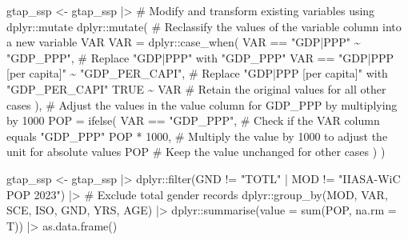 \documentclass[
  letterpaper,
  DIV=11,
  numbers=noendperiod]{scrartcl}
\newenvironment{Shaded}{}{}
\newcommand{\AttributeTok}[1]{\textcolor[rgb]{0.00,0.34,0.68}{#1}}
\newcommand{\CommentTok}[1]{\textcolor[rgb]{0.54,0.53,0.53}{#1}}
\newcommand{\ConstantTok}[1]{\textcolor[rgb]{0.67,0.33,0.00}{#1}}
\newcommand{\DecValTok}[1]{\textcolor[rgb]{0.69,0.50,0.00}{#1}}
\newcommand{\FunctionTok}[1]{\textcolor[rgb]{0.39,0.29,0.61}{#1}}
\newcommand{\NormalTok}[1]{\textcolor[rgb]{0.12,0.11,0.11}{#1}}
\newcommand{\OtherTok}[1]{\textcolor[rgb]{0.00,0.43,0.16}{#1}}
\newcommand{\SpecialCharTok}[1]{\textcolor[rgb]{0.24,0.68,0.91}{#1}}
\newcommand{\StringTok}[1]{\textcolor[rgb]{0.75,0.01,0.01}{#1}}
\begin{document}
\begin{Shaded}
\begin{Highlighting}[]
\NormalTok{gtap\_ssp }\OtherTok{\textless{}{-}}\NormalTok{ gtap\_ssp }\SpecialCharTok{|\textgreater{}}
  \CommentTok{\# Modify and transform existing variables using dplyr::mutate}
\NormalTok{  dplyr}\SpecialCharTok{::}\FunctionTok{mutate}\NormalTok{(}
    \CommentTok{\# Reclassify the values of the \textquotesingle{}variable\textquotesingle{} column into a new variable \textquotesingle{}VAR\textquotesingle{}}
    \AttributeTok{VAR =}\NormalTok{ dplyr}\SpecialCharTok{::}\FunctionTok{case\_when}\NormalTok{(}
\NormalTok{      VAR }\SpecialCharTok{==} \StringTok{"GDP|PPP"} \SpecialCharTok{\textasciitilde{}} \StringTok{"GDP\_PPP"}\NormalTok{,                }\CommentTok{\# Replace "GDP|PPP" with "GDP\_PPP"}
\NormalTok{      VAR }\SpecialCharTok{==} \StringTok{"GDP|PPP [per capita]"} \SpecialCharTok{\textasciitilde{}} \StringTok{"GDP\_PER\_CAPI"}\NormalTok{,  }\CommentTok{\# Replace "GDP|PPP [per capita]" with "GDP\_PER\_CAPI"}
      \ConstantTok{TRUE} \SpecialCharTok{\textasciitilde{}}\NormalTok{ VAR                                    }\CommentTok{\# Retain the original values for all other cases}
\NormalTok{    ),}
    \CommentTok{\# Adjust the values in the \textquotesingle{}value\textquotesingle{} column for GDP\_PPP by multiplying by 1000}
    \AttributeTok{POP =} \FunctionTok{ifelse}\NormalTok{(}
\NormalTok{      VAR }\SpecialCharTok{==} \StringTok{"GDP\_PPP"}\NormalTok{,    }\CommentTok{\# Check if the \textquotesingle{}VAR\textquotesingle{} column equals "GDP\_PPP"}
\NormalTok{      POP }\SpecialCharTok{*} \DecValTok{1000}\NormalTok{,        }\CommentTok{\# Multiply the value by 1000 to adjust the unit for absolute values}
\NormalTok{      POP                }\CommentTok{\# Keep the value unchanged for other cases}
\NormalTok{    )}
\NormalTok{  )}

\NormalTok{gtap\_ssp }\OtherTok{\textless{}{-}}\NormalTok{ gtap\_ssp  }\SpecialCharTok{|\textgreater{}}    
\NormalTok{  dplyr}\SpecialCharTok{::}\FunctionTok{filter}\NormalTok{(GND }\SpecialCharTok{!=} \StringTok{"TOTL"} \SpecialCharTok{|}\NormalTok{ MOD }\SpecialCharTok{!=} \StringTok{"IIASA{-}WiC POP 2023"}\NormalTok{) }\SpecialCharTok{|\textgreater{}} \CommentTok{\# Exclude total gender records}
\NormalTok{  dplyr}\SpecialCharTok{::}\FunctionTok{group\_by}\NormalTok{(MOD, VAR, SCE, ISO, GND, YRS, AGE) }\SpecialCharTok{|\textgreater{}} 
\NormalTok{  dplyr}\SpecialCharTok{::}\FunctionTok{summarise}\NormalTok{(}\AttributeTok{value =} \FunctionTok{sum}\NormalTok{(POP, }\AttributeTok{na.rm =}\NormalTok{ T)) }\SpecialCharTok{|\textgreater{}} 
  \FunctionTok{as.data.frame}\NormalTok{()}
\end{Highlighting}
\end{Shaded}
\end{document}
